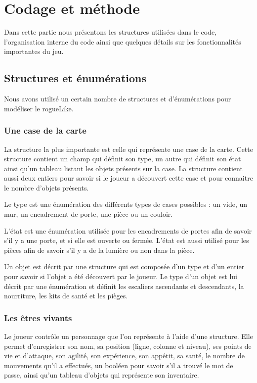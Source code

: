 \documentclass[11pt]{report}
\begin{document}
\chapter{Codage et méthode}

Dans cette partie nous présentons les structures utilisées dans le code, l'organisation interne du code ainsi que quelques détails sur les fonctionnalités importantes du jeu.
	\section{Structures et énumérations}
	
	Nous avons utilisé un certain nombre de structures et d'énumérations pour modéliser le rogueLike.
	
		\subsection{Une case de la carte}
	
		La structure la plus importante est celle qui représente une case de la carte. Cette structure contient un champ qui définit son type, un autre qui définit son état ainsi qu'un tableau listant les objets présents sur la case. La structure contient aussi deux entiers pour savoir si le joueur a découvert cette case et pour connaitre le nombre d'objets présents.
	
		Le type est une énumération des différents types de cases possibles : un vide, un mur, un encadrement de porte, une pièce ou un couloir.
	
		L'état est une énumération utilisée pour les encadrements de portes afin de savoir s'il y a une porte, et si elle est ouverte ou fermée. L'état est aussi utilisé pour les pièces afin de savoir s'il y a de la lumière ou non dans la pièce.
	
		Un objet est décrit par une structure qui est composée d'un type et d'un entier pour savoir si l'objet a été découvert par le joueur. Le type d'un objet est lui décrit par une énumération et définit les escaliers ascendants et descendants, la nourriture, les kits de santé et les pièges.
		
		\subsection{Les êtres vivants}
		
		Le joueur contrôle un personnage que l'on représente à l'aide d'une structure. Elle permet d'enregistrer son nom, sa position (ligne, colonne et niveau), ses points de vie et d'attaque, son agilité, son expérience, son appétit, sa santé, le nombre de mouvements qu'il a effectués, un booléen pour savoir s'il a trouvé le mot de passe, ainsi qu'un tableau d'objets qui représente son inventaire.
		
\end{document}
